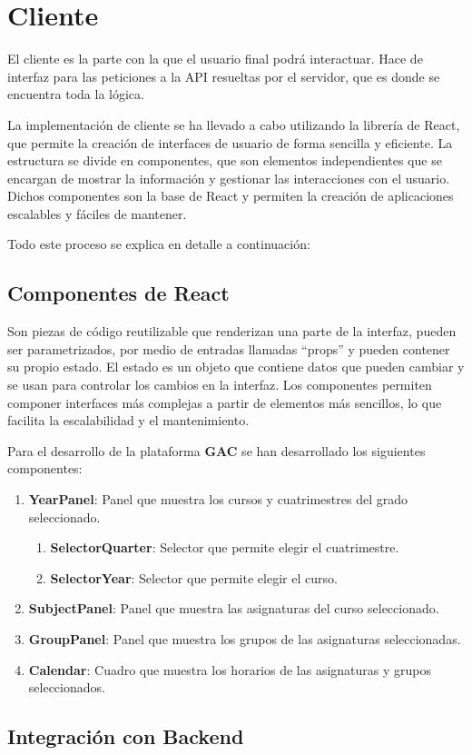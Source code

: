 \section{Cliente}

El cliente es la parte con la que el usuario final podrá interactuar. Hace de interfaz para las peticiones a la API resueltas por el servidor, que es donde se encuentra toda la lógica.\newline

La implementación de cliente se ha llevado a cabo utilizando la librería de React, que permite la creación de interfaces de usuario de forma sencilla y eficiente. La estructura se divide en componentes, que son elementos independientes que se encargan de mostrar la información y gestionar las interacciones con el usuario. Dichos componentes son la base de React y permiten la creación de aplicaciones escalables y fáciles de mantener.\newline

Todo este proceso se explica en detalle a continuación:\newline

\subsection{Componentes de React}

Son piezas de código reutilizable que renderizan una parte de la interfaz, pueden ser parametrizados, por medio de entradas llamadas ``props'' y pueden contener su propio estado. El estado es un objeto que contiene datos que pueden cambiar y se usan para controlar los cambios en la interfaz. Los componentes permiten componer interfaces más complejas a partir de elementos más sencillos, lo que facilita la escalabilidad y el mantenimiento.\newline


Para el desarrollo de la plataforma \textbf{GAC} se han desarrollado los siguientes componentes:

\begin{enumerate}
    \item \textbf{YearPanel}: Panel que muestra los cursos y cuatrimestres del grado seleccionado.
    \begin{enumerate}
        \item \textbf{SelectorQuarter}: Selector que permite elegir el cuatrimestre.
        \item \textbf{SelectorYear}: Selector que permite elegir el curso.
    \end{enumerate}
    \item \textbf{SubjectPanel}: Panel que muestra las asignaturas del curso seleccionado.
    \item \textbf{GroupPanel}: Panel que muestra los grupos de las asignaturas seleccionadas.
    \item \textbf{Calendar}: Cuadro que muestra los horarios de las asignaturas y grupos seleccionados.
\end{enumerate}

\subsection{Integración con Backend}
